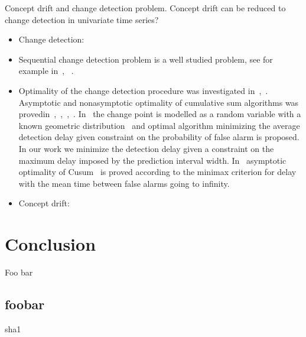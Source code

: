 \documentclass[licentiate,utf8,lot,loar,lof,shortloft,index]{jydiss}
\begin{document}
Concept drift and change detection problem.
Concept drift can be reduced to change detection in univariate time series?




\begin{itemize}
  \item Change detection:~\cite{basseville1993detection}

  \item Sequential change detection problem is a well studied problem, see for example in~\cite{tartakovsky2014sequential}, ~\cite{plasse2021streaming}. 

  \item Optimality of the change detection procedure was investigated in~\cite{Page1954},~\cite{Shiryaev2010,Shiryaev1961,Shiryaev1963}.
  Asymptotic and nonasymptotic optimality of cumulative sum algorithms was provedin~\cite{lorden1971procedures},~\cite{moustakides1986optimal},~\cite{moustakides2004optimality},~\cite{ritov1990decision}. In~\cite{Shiryaev1963,shiryaev2007optimal} the change point is modelled as a random variable with a known geometric distribution~\cite{veeravalli2014quickest} and optimal algorithm minimizing the average detection delay given constraint on the probability of false alarm is proposed. In our work we minimize the detection delay given a constraint on the maximum delay imposed by the prediction interval width. In~\cite{lorden1971procedures} asymptotic optimality of Cusum~\cite{Page1954} is proved according to the minimax criterion for delay with the mean time between false alarms going to infinity.

  \item Concept drift:
\end{itemize}

\chapter{Conclusion}

\tailmatter
\finnishsummary
Foo bar


\appendices
{}
\section{foobar}

\backmatter

\begin{article}{sha1}
\end{article}
\end{document}
